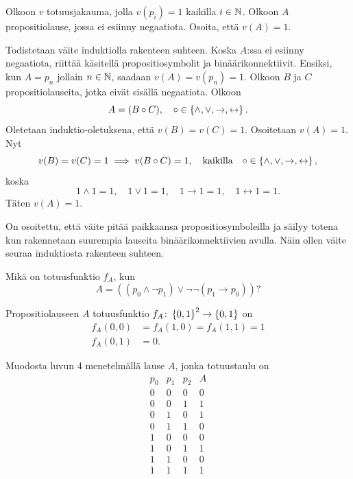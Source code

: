 \documentclass[11pt,a4paper]{amsart}
\begin{document}
\begin{exercise}
Olkoon \(v\) totuusjakauma, jolla \(v(p_i) = 1\) kaikilla \(i \in \mathbb{N}\).
Olkoon \(A\) propositiolause, jossa ei esiinny negaatiota. Osoita, että
\(v(A) = 1\).
\end{exercise}

\begin{solution}
Todistetaan väite induktiolla rakenteen suhteen. Koska \(A\):ssa ei
esiinny negaatiota, riittää käsitellä propositiosymbolit ja
binäärikonnektiivit. Ensiksi, kun \(A = p_n\)
jollain \(n \in \mathbb{N}\), saadaan \(v(A) = v(p_n) = 1\). Olkoon \(B\) ja \(C\)
propositiolauseita, jotka eivät sisällä negaatiota. Olkoon
\[
A = (B \circ C), \quad \circ \in \left\lbrace\land, \lor, \rightarrow,
\leftrightarrow\right\rbrace.
\]
Oletetaan induktio-oletuksena, että \(v(B) = v(C) = 1\).
Osoitetaan \(v(A) = 1\). Nyt
\[
v(B) = v(C) = 1 \implies v(B \circ C) = 1, \quad \text{kaikilla} \quad
\circ \in \left\lbrace\land, \lor, \rightarrow, \leftrightarrow\right\rbrace,
\]
koska
\[
1 \land 1 = 1, \quad 1 \lor 1 = 1, \quad 1 \rightarrow 1 = 1, \quad 1
\leftrightarrow 1 = 1.
\]
Täten \(v(A) = 1\).

On osoitettu, että väite pitää paikkaansa propositiosymboleilla ja
säilyy totena kun rakennetaan suurempia lauseita binäärikonnektiivien avulla.
Näin ollen väite seuraa induktiosta rakenteen suhteen.
\end{solution}

\begin{exercise}
Mikä on totuusfunktio \(f_A\), kun
\[
A = ((p_0 \land \neg p_1) \lor \neg \neg(p_1 \rightarrow p_0))?
\]
\end{exercise}

\begin{solution}
Propositiolauseen \(A\) totuusfunktio \(f_A \colon \left\lbrace0, 1\right\rbrace^2
\rightarrow \left\lbrace0, 1\right\rbrace\) on
\[
\begin{aligned}
f_A(0, 0) &= f_A(1, 0) = f_A(1, 1) = 1 \\
f_A(0, 1) &= 0.
\end{aligned}
\]
\end{solution}

\begin{exercise}
Muodosta luvun 4 menetelmällä lause \(A\), jonka totuustaulu on
\[
\begin{array}{ccc|c}
p_0 & p_1 & p_2 & A \\
\hline
0 & 0 & 0 & 0 \\
0 & 0 & 1 & 1 \\
0 & 1 & 0 & 1 \\
0 & 1 & 1 & 0 \\
1 & 0 & 0 & 0 \\
1 & 0 & 1 & 1 \\
1 & 1 & 0 & 0 \\
1 & 1 & 1 & 1
\end{array}
\]
\end{exercise}
\end{document}

